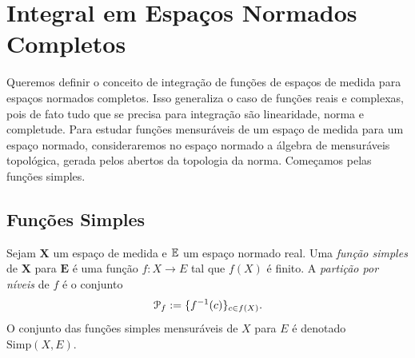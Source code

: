 \section{Integral em Espaços Normados Completos}

Queremos definir o conceito de integração de funções de espaços de medida para espaços normados completos. Isso generaliza o caso de funções reais e complexas, pois de fato tudo que se precisa para integração são linearidade, norma e completude. Para estudar funções mensuráveis de um espaço de medida para um espaço normado, consideraremos no espaço normado a álgebra de mensuráveis topológica, gerada pelos abertos da topologia da norma. Começamos pelas funções simples.

\subsection{Funções Simples}

\newcommand{\Simp}{\mathrm{Simp}}

\begin{defi}
Sejam $\bm X$ um espaço de medida e $\mathbb{E}$ um espaço normado real. Uma \emph{função simples} de $\bm X$ para $\bm E$ é uma função $f\colon X \to E$ tal que $f(X)$ é finito. A \emph{partição por níveis} de $f$ é o conjunto
	\begin{equation*}
	\mathcal P_f := \{f^{-1}(c)\}_{c \in f(X)}.
	\end{equation*}
O conjunto das funções simples mensuráveis de $X$ para $E$ é denotado $\Simp(X,E)$.
\end{defi}

